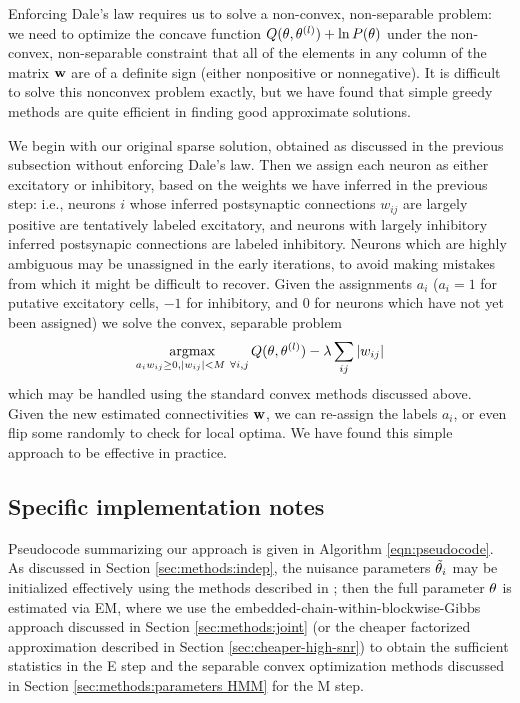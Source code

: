 Enforcing Dale's law requires us to solve a non-convex, non-separable problem: we need to optimize the concave function $Q(\mathbf{\theta},\mathbf{\theta}^{(l)}) + \ln P(\mathbf{\theta})$ under the non-convex, non-separable constraint that all of the elements in any column of the matrix $\mathbf{w}$ are of a definite sign (either nonpositive or nonnegative). It is difficult to solve this nonconvex problem exactly, but we have found that simple greedy methods are quite efficient in finding good approximate solutions.

We begin with our original sparse solution, obtained as discussed in the previous subsection without enforcing Dale's law. Then we assign each neuron as either excitatory or inhibitory, based on the weights we have inferred in the previous step: i.e., neurons $i$ whose inferred postsynaptic connections $w_{ij}$ are largely positive are tentatively labeled excitatory, and neurons with largely inhibitory inferred postsynapic connections are labeled inhibitory. Neurons which are highly ambiguous may be unassigned in the early iterations, to avoid making mistakes from which it might be difficult to recover. Given the assignments $a_i$ ($a_i =1$ for putative excitatory cells, $-1$ for inhibitory, and $0$ for neurons which have not yet been assigned) we solve the convex, separable problem \begin{equation} \operatorname*{argmax}_{\substack{a_i w_{ij} \geq 0, |w_{ij}|<M ~ \forall i,j}} Q(\mathbf{\theta},\mathbf{\theta}^{(l)}) - \lambda \sum_{ij} |w_{ij}| \end{equation} which may be handled using the standard convex methods discussed above. Given the new estimated connectivities $\mathbf{w}$, we can re-assign the labels $a_i$, or even flip some randomly to check for local optima. We have found this simple approach to be effective in practice.


\subsection{Specific implementation notes} \label{sec:methods:specific_implementation}

Pseudocode summarizing our approach is given in Algorithm \ref{eqn:pseudocode}. As discussed in Section \ref{sec:methods:indep}, the nuisance parameters $\tilde{\mathbf{\theta}}_i$ may be initialized effectively using the methods described in \cite{Vogelstein2009}; then the full parameter $\mathbf{\theta}$ is estimated via EM, where we use the embedded-chain-within-blockwise-Gibbs approach discussed in Section \ref{sec:methods:joint} (or the cheaper factorized approximation described in Section \ref{sec:cheaper-high-snr}) to obtain the sufficient statistics in the E step and the separable convex optimization methods discussed in Section \ref{sec:methods:parameters HMM} for the M step.


